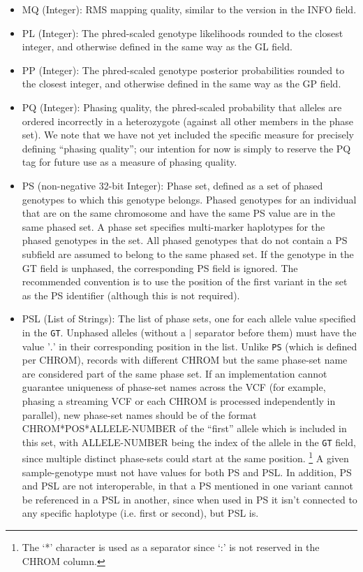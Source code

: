 \documentclass[8pt]{article}
\begin{document}
\begin{itemize}
  \item MQ (Integer): RMS mapping quality, similar to the version in the INFO field.
  \item PL (Integer): The phred-scaled genotype likelihoods rounded to the closest integer, and otherwise defined in the same way as the GL field.
  \item PP (Integer): The phred-scaled genotype posterior probabilities rounded to the closest integer, and otherwise defined in the same way as the GP field.
  \item PQ (Integer): Phasing quality, the phred-scaled probability that alleles are ordered incorrectly in a heterozygote (against all other members in the phase set).
  We note that we have not yet included the specific measure for precisely defining ``phasing quality''; our intention for now is simply to reserve the PQ tag for future use as a measure of phasing quality.
  \item PS (non-negative 32-bit Integer): Phase set, defined as a set of phased genotypes to which this genotype belongs.
  Phased genotypes for an individual that are on the same chromosome and have the same PS value are in the same phased set.
  A phase set specifies multi-marker haplotypes for the phased genotypes in the set.
  All phased genotypes that do not contain a PS subfield are assumed to belong to the same phased set.
  If the genotype in the GT field is unphased, the corresponding PS field is ignored.
  The recommended convention is to use the position of the first variant in the set as the PS identifier (although this is not required).
  \item PSL (List of Strings): The list of phase sets, one for each allele value specified in the {\tt GT}. 
  Unphased alleles (without a $\mid$ separator before them) must have the value '$.$' in their corresponding position in the list.
  Unlike {\tt PS} (which is defined per CHROM), records with different CHROM but the same phase-set name are considered part of the same phase set.
  If an implementation cannot guarantee uniqueness of phase-set names across the VCF (for example, phasing a streaming VCF or each CHROM is processed independently in parallel), new phase-set names should be of the format CHROM*POS*ALLELE-NUMBER of the ``first'' allele which is included in this set, with ALLELE-NUMBER being the index of the allele in the {\tt GT} field, since multiple distinct phase-sets could start at the same position. \footnote{The `*' character is used as a separator since `:' is not reserved in the CHROM column.}
  A given sample-genotype must not have values for both PS and PSL.
  In addition, PS and PSL are not interoperable, in that a PS mentioned in one variant cannot be referenced in a PSL in another,  since when used in PS it isn't connected to any specific haplotype (i.e. first or second), but PSL is. 
 

\end{itemize}
\end{document}
